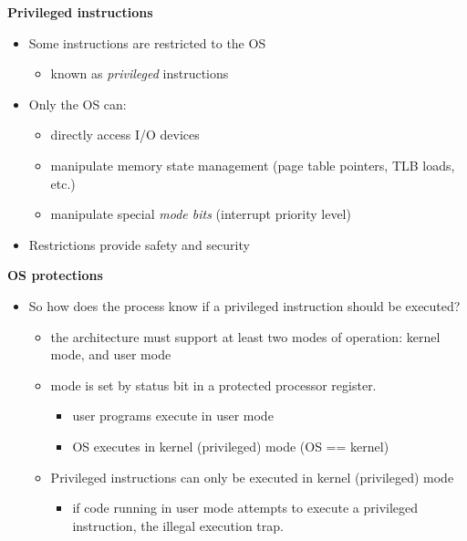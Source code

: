 \documentclass[11pt,a4paper]{article}
\begin{document}
\textbf{Privileged instructions}
\begin{itemize}
    \item Some instructions are restricted to the OS
        \begin{itemize}
            \item known as \emph{privileged} instructions
        \end{itemize}
    \item Only the OS can:
        \begin{itemize}
            \item directly access I/O devices
            \item manipulate memory state management (page table pointers, TLB loads, etc.)
            \item manipulate special \emph{mode bits} (interrupt priority level)
        \end{itemize}
    \item Restrictions provide safety and security
\end{itemize}

\textbf{OS protections}
\begin{itemize}
    \item So how does the process know if a privileged instruction should be executed?
        \begin{itemize}
            \item the architecture must support at least two modes of operation:
                kernel mode, and user mode
            \item mode is set by status bit in a protected processor register.
                \begin{itemize}
                    \item user programs execute in user mode
                    \item OS executes in kernel (privileged) mode (OS == kernel)
                \end{itemize}
            \item Privileged instructions can only be executed in kernel (privileged) mode
                \begin{itemize}
                    \item if code running in user mode attempts to execute a privileged
                        instruction, the illegal execution trap.
                \end{itemize}
        \end{itemize}
\end{itemize}
\end{document}
